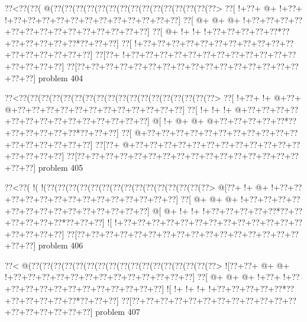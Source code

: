 \vbox{\vbox{\goo
\0??<\0??(\0??(\- @(\0??(\0??(\0??(\0??(\0??(\0??(\0??(\0??(\0??(\0??(\0??(\0??(\0??(\0??(\0??>
\0??[\- !+\0??+\- @+\- !+\0??+\- !+\0??+\0??+\0??+\0??+\0??+\0??+\0??+\0??+\0??+\0??+\0??+\0??]
\0??[\- @+\- @+\- @+\- !+\0??+\0??+\0??+\0??+\0??+\0??+\0??+\0??+\0??+\0??+\0??+\0??+\0??+\0??]
\0??[\- @+\- !+\- !+\- !+\0??+\0??+\0??+\0??+\0??*\0??+\0??+\0??+\0??+\0??+\0??*\0??+\0??+\0??]
\0??[\- !+\0??+\0??+\0??+\0??+\0??+\0??+\0??+\0??+\0??+\0??+\0??+\0??+\0??+\0??+\0??+\0??+\0??]
\0??[\0??+\- !+\0??+\0??+\0??+\0??+\0??+\0??+\0??+\0??+\0??+\0??+\0??+\0??+\0??+\0??+\0??+\0??]
\0??[\0??+\0??+\0??+\0??+\0??+\0??+\0??+\0??+\0??+\0??+\0??+\0??+\0??+\0??+\0??+\0??+\0??+\0??]
}
\hfil problem 404\hfil\break
}



\vbox{\vbox{\goo
\0??<\0??(\0??(\0??(\0??(\0??(\0??(\0??(\0??(\0??(\0??(\0??(\0??(\0??(\0??(\0??(\0??(\0??(\0??>
\0??[\- !+\0??+\- !+\- @+\0??+\- @+\0??+\0??+\0??+\0??+\0??+\0??+\0??+\0??+\0??+\0??+\0??+\0??]
\0??[\- !+\- !+\- !+\- @+\0??+\0??+\0??+\0??+\0??+\0??+\0??+\0??+\0??+\0??+\0??+\0??+\0??+\0??]
\- @[\- !+\- @+\- @+\- @+\0??+\0??+\0??+\0??+\0??*\0??+\0??+\0??+\0??+\0??+\0??*\0??+\0??+\0??]
\0??[\- @+\0??+\0??+\0??+\0??+\0??+\0??+\0??+\0??+\0??+\0??+\0??+\0??+\0??+\0??+\0??+\0??+\0??]
\0??[\0??+\- @+\0??+\0??+\0??+\0??+\0??+\0??+\0??+\0??+\0??+\0??+\0??+\0??+\0??+\0??+\0??+\0??]
\0??[\0??+\0??+\0??+\0??+\0??+\0??+\0??+\0??+\0??+\0??+\0??+\0??+\0??+\0??+\0??+\0??+\0??+\0??]
}
\hfil problem 405\hfil\break
}



\vbox{\vbox{\goo
\0??<\0??(\- !(\- !(\0??(\0??(\0??(\0??(\0??(\0??(\0??(\0??(\0??(\0??(\0??(\0??(\0??(\0??(\0??>
\- @[\0??+\- !+\- @+\- !+\0??+\0??+\0??+\0??+\0??+\0??+\0??+\0??+\0??+\0??+\0??+\0??+\0??+\0??]
\0??[\- @+\- @+\- @+\- !+\0??+\0??+\0??+\0??+\0??+\0??+\0??+\0??+\0??+\0??+\0??+\0??+\0??+\0??]
\- @[\- @+\- !+\- !+\- !+\0??+\0??+\0??+\0??+\0??*\0??+\0??+\0??+\0??+\0??+\0??*\0??+\0??+\0??]
\- ![\- !+\0??+\0??+\0??+\0??+\0??+\0??+\0??+\0??+\0??+\0??+\0??+\0??+\0??+\0??+\0??+\0??+\0??]
\0??[\0??+\0??+\0??+\0??+\0??+\0??+\0??+\0??+\0??+\0??+\0??+\0??+\0??+\0??+\0??+\0??+\0??+\0??]
}
\hfil problem 406\hfil\break
}



\vbox{\vbox{\goo
\0??<\- @(\0??(\0??(\0??(\0??(\0??(\0??(\0??(\0??(\0??(\0??(\0??(\0??(\0??(\0??(\0??(\0??(\0??>
\- ![\0??+\0??+\- @+\- @+\- !+\0??+\0??+\0??+\0??+\0??+\0??+\0??+\0??+\0??+\0??+\0??+\0??+\0??]
\0??[\- @+\- @+\- @+\- !+\0??+\- !+\0??+\0??+\0??+\0??+\0??+\0??+\0??+\0??+\0??+\0??+\0??+\0??]
\- ![\- !+\- !+\- !+\- !+\0??+\0??+\0??+\0??+\0??*\0??+\0??+\0??+\0??+\0??+\0??*\0??+\0??+\0??]
\0??[\0??+\0??+\0??+\0??+\0??+\0??+\0??+\0??+\0??+\0??+\0??+\0??+\0??+\0??+\0??+\0??+\0??+\0??]
}
\hfil problem 407\hfil\break
}



